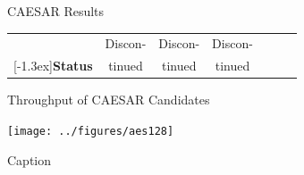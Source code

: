 \documentclass[xcolor=pdftex,dvipsnames,table,final]{beamer}
\newcommand{\rb}[1]{\raisebox{1.3ex}[-1.3ex]{#1}}
\begin{document}
\begin{frame}[fragile]{}
\begin{columns}[t, totalwidth=\textwidth]
\begin{column}{.675\linewidth}
\begin{columns}
\begin{column}{.473\linewidth}
\begin{block}{CAESAR Results}
\begin{center}
{\begin{tabular}{|r||c|c|c|c||c|c}
                                  &Discon-   &Discon-     &Discon-        &              &              &               \\ 
            \rowcolor{RoyalBlue!5}%
            \rb{\textbf{Status}}  &tinued    &tinued      &tinued         &              &              &               \\ \hline
          \end{tabular}
        }
        \end{center}
       \end{block}
       \begin{block}{Throughput of CAESAR Candidates}
        \vspace{-1ex}
         \begin{center}
           \texttt{[image: ../figures/aes128]}

           {\small Caption}
         \end{center}
       \end{block}
%          
%          
   \end{column}
   \end{columns}


\end{column}
\end{columns}
\end{frame}
\end{document}
